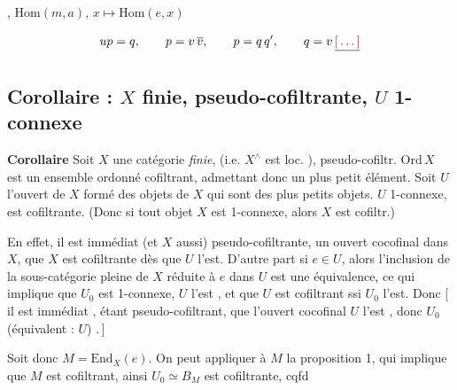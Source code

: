 \documentclass[11pt,a4paper]{article}
\begin{document}


, $\mathrm{Hom}(m,a)$,
$x \mapsto \mathrm{Hom}(e,x)$

\[
  up = q, \qquad p = v\,\overline{v}, \qquad p = q\,q', \qquad
  q = v\,\struck{\ill{}}
\]

\subsection*{Corollaire : $X$ finie, pseudo-cofiltrante, $U$ 1-connexe}


\textbf{Corollaire} Soit $X$ une catégorie \emph{finie},
(i.e. $X^\wedge$ est loc. ),
pseudo-cofiltr.   $\mathrm{Ord}\, X$ est un ensemble
ordonné cofiltrant, admettant donc un plus petit élément. Soit $U$ l'ouvert de
$X$ formé des objets de $X$ qui sont des plus petits objets.
 \ill{} $U$ 1-connexe,   est
cofiltrante. (Donc si tout objet  $X$ est 1-connexe, alors
$X$ est cofiltr.)

En effet, il est immédiat   (et $X$ aussi)
pseudo-cofiltrante, un ouvert cocofinal dans $X$, que $X$ est cofiltrante dès
que $U$ l'est. D'autre part si $e \in U$, alors  l'inclusion de la
sous-catégorie pleine \supplied{(}de $X$ réduite\supplied{)} à $e$ dans $U$ est une
équivalence, ce qui implique que $U_0$ est 1-connexe, $U$ l'est
, et que $U$ est cofiltrant ssi $U_0$ l'est. Donc [\,il est
immédiat ,  étant pseudo-cofiltrant, que l'ouvert
cocofinal $U$ l'est , donc $U_0$ (équivalent : $U$)
.\,]

Soit donc $M = \mathrm{End}_X(e)$. On peut appliquer à $M$ la proposition 1,
qui implique que $M$ est cofiltrant, ainsi $U_0 \simeq B_M$ est cofiltrante,
cqfd
\end{document}
